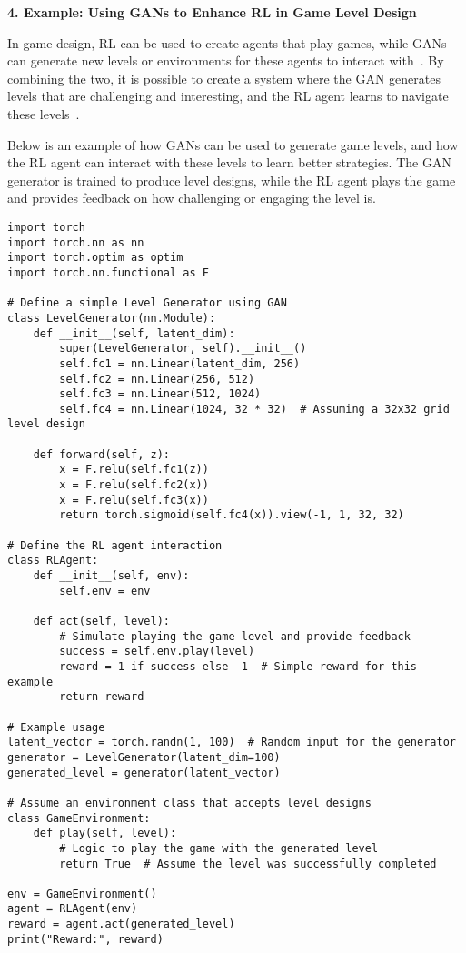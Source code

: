 \textbf{4. Example: Using GANs to Enhance RL in Game Level Design}

In game design, RL can be used to create agents that play games, while GANs can generate new levels or environments for these agents to interact with~\cite{de2021survey}. By combining the two, it is possible to create a system where the GAN generates levels that are challenging and interesting, and the RL agent learns to navigate these levels~\cite{sarmad2019rl}.

Below is an example of how GANs can be used to generate game levels, and how the RL agent can interact with these levels to learn better strategies. The GAN generator is trained to produce level designs, while the RL agent plays the game and provides feedback on how challenging or engaging the level is.

\begin{lstlisting}[style=python]
import torch
import torch.nn as nn
import torch.optim as optim
import torch.nn.functional as F

# Define a simple Level Generator using GAN
class LevelGenerator(nn.Module):
    def __init__(self, latent_dim):
        super(LevelGenerator, self).__init__()
        self.fc1 = nn.Linear(latent_dim, 256)
        self.fc2 = nn.Linear(256, 512)
        self.fc3 = nn.Linear(512, 1024)
        self.fc4 = nn.Linear(1024, 32 * 32)  # Assuming a 32x32 grid level design
    
    def forward(self, z):
        x = F.relu(self.fc1(z))
        x = F.relu(self.fc2(x))
        x = F.relu(self.fc3(x))
        return torch.sigmoid(self.fc4(x)).view(-1, 1, 32, 32)

# Define the RL agent interaction
class RLAgent:
    def __init__(self, env):
        self.env = env
    
    def act(self, level):
        # Simulate playing the game level and provide feedback
        success = self.env.play(level)
        reward = 1 if success else -1  # Simple reward for this example
        return reward

# Example usage
latent_vector = torch.randn(1, 100)  # Random input for the generator
generator = LevelGenerator(latent_dim=100)
generated_level = generator(latent_vector)

# Assume an environment class that accepts level designs
class GameEnvironment:
    def play(self, level):
        # Logic to play the game with the generated level
        return True  # Assume the level was successfully completed

env = GameEnvironment()
agent = RLAgent(env)
reward = agent.act(generated_level)
print("Reward:", reward)
\end{lstlisting}


